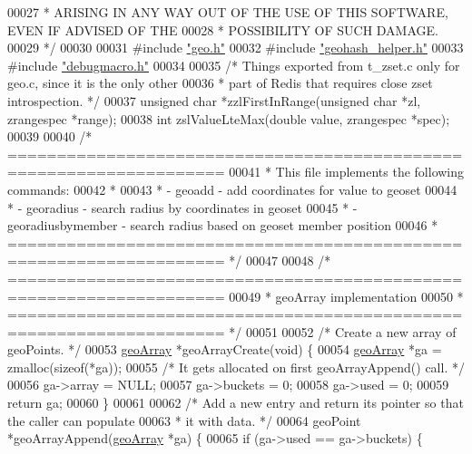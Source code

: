\begin{DoxyCode}
00027 \textcolor{comment}{ * ARISING IN ANY WAY OUT OF THE USE OF THIS SOFTWARE, EVEN IF ADVISED OF THE}
00028 \textcolor{comment}{ * POSSIBILITY OF SUCH DAMAGE.}
00029 \textcolor{comment}{ */}
00030 
00031 \textcolor{preprocessor}{#}\textcolor{preprocessor}{include} \hyperlink{geo_8h}{"geo.h"}
00032 \textcolor{preprocessor}{#}\textcolor{preprocessor}{include} \hyperlink{geohash__helper_8h}{"geohash\_helper.h"}
00033 \textcolor{preprocessor}{#}\textcolor{preprocessor}{include} \hyperlink{debugmacro_8h}{"debugmacro.h"}
00034 
00035 \textcolor{comment}{/* Things exported from t\_zset.c only for geo.c, since it is the only other}
00036 \textcolor{comment}{ * part of Redis that requires close zset introspection. */}
00037 \textcolor{keywordtype}{unsigned} \textcolor{keywordtype}{char} *zzlFirstInRange(\textcolor{keywordtype}{unsigned} \textcolor{keywordtype}{char} *zl, zrangespec *range);
00038 \textcolor{keywordtype}{int} zslValueLteMax(\textcolor{keywordtype}{double} value, zrangespec *spec);
00039 
00040 \textcolor{comment}{/* ====================================================================}
00041 \textcolor{comment}{ * This file implements the following commands:}
00042 \textcolor{comment}{ *}
00043 \textcolor{comment}{ *   - geoadd - add coordinates for value to geoset}
00044 \textcolor{comment}{ *   - georadius - search radius by coordinates in geoset}
00045 \textcolor{comment}{ *   - georadiusbymember - search radius based on geoset member position}
00046 \textcolor{comment}{ * ==================================================================== */}
00047 
00048 \textcolor{comment}{/* ====================================================================}
00049 \textcolor{comment}{ * geoArray implementation}
00050 \textcolor{comment}{ * ==================================================================== */}
00051 
00052 \textcolor{comment}{/* Create a new array of geoPoints. */}
00053 \hyperlink{structgeoArray}{geoArray} *geoArrayCreate(\textcolor{keywordtype}{void}) \{
00054     \hyperlink{structgeoArray}{geoArray} *ga = zmalloc(\textcolor{keyword}{sizeof}(*ga));
00055     \textcolor{comment}{/* It gets allocated on first geoArrayAppend() call. */}
00056     ga->array = NULL;
00057     ga->buckets = 0;
00058     ga->used = 0;
00059     \textcolor{keywordflow}{return} ga;
00060 \}
00061 
00062 \textcolor{comment}{/* Add a new entry and return its pointer so that the caller can populate}
00063 \textcolor{comment}{ * it with data. */}
00064 geoPoint *geoArrayAppend(\hyperlink{structgeoArray}{geoArray} *ga) \{
00065     \textcolor{keywordflow}{if} (ga->used == ga->buckets) \{

\end{DoxyCode}

